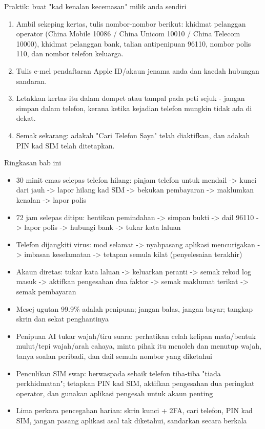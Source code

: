 \begin{tcbpractice}{Praktik: buat "kad kenalan kecemasan" milik anda sendiri}
\begin{enumerate}
  \item Ambil sekeping kertas, tulis nombor-nombor berikut: khidmat pelanggan operator (China Mobile 10086 / China Unicom 10010 / China Telecom 10000), khidmat pelanggan bank, talian antipenipuan 96110, nombor polis 110, dan nombor telefon keluarga.
  \item Tulis e-mel pendaftaran Apple ID/akaun jenama anda dan kaedah hubungan sandaran.
  \item Letakkan kertas itu dalam dompet atau tampal pada peti sejuk - jangan simpan dalam telefon, kerana ketika kejadian telefon mungkin tidak ada di dekat.
  \item Semak sekarang: adakah "Cari Telefon Saya" telah diaktifkan, dan adakah PIN kad SIM telah ditetapkan.
\end{enumerate}

\end{tcbpractice}

\begin{tcbsummary}{Ringkasan bab ini}
\begin{itemize}
  \item 30 minit emas selepas telefon hilang: pinjam telefon untuk mendail -> kunci dari jauh -> lapor hilang kad SIM -> bekukan pembayaran -> maklumkan kenalan -> lapor polis
  \item 72 jam selepas ditipu: hentikan pemindahan -> simpan bukti -> dail 96110 -> lapor polis -> hubungi bank -> tukar kata laluan
  \item Telefon dijangkiti virus: mod selamat -> nyahpasang aplikasi mencurigakan -> imbasan keselamatan -> tetapan semula kilat (penyelesaian terakhir)
  \item Akaun diretas: tukar kata laluan -> keluarkan peranti -> semak rekod log masuk -> aktifkan pengesahan dua faktor -> semak maklumat terikat -> semak pembayaran
  \item Mesej ugutan 99.9\% adalah penipuan; jangan balas, jangan bayar; tangkap skrin dan sekat penghantinya
  \item Penipuan AI tukar wajah/tiru suara: perhatikan celah kelipan mata/bentuk mulut/tepi wajah/arah cahaya, minta pihak itu menoleh dan menutup wajah, tanya soalan peribadi, dan dail semula nombor yang diketahui
  \item Penculikan SIM swap: berwaspada sebaik telefon tiba-tiba "tiada perkhidmatan"; tetapkan PIN kad SIM, aktifkan pengesahan dua peringkat operator, dan gunakan aplikasi pengesah untuk akaun penting
  \item Lima perkara pencegahan harian: skrin kunci + 2FA, cari telefon, PIN kad SIM, jangan pasang aplikasi asal tak diketahui, sandarkan secara berkala
\end{itemize}

\end{tcbsummary}
